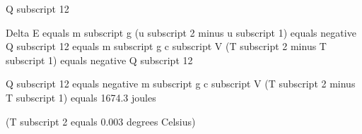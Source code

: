 Q subscript 12  

Delta E equals m subscript g (u subscript 2 minus u subscript 1) equals negative Q subscript 12  
equals m subscript g c subscript V (T subscript 2 minus T subscript 1) equals negative Q subscript 12  

Q subscript 12 equals negative m subscript g c subscript V (T subscript 2 minus T subscript 1) equals 1674.3 joules  

(T subscript 2 equals 0.003 degrees Celsius)